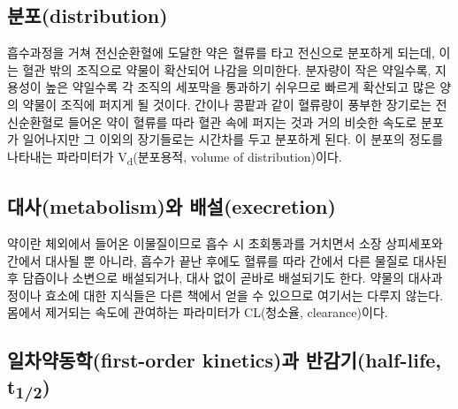 \documentclass[
  11pt,
  krantz2, a4paper, twoside]{krantz}
\theoremstyle{definition}
\theoremstyle{definition}
\theoremstyle{definition}
\theoremstyle{definition}
\theoremstyle{remark}
\begin{document}
\subsection{분포(distribution)}\label{uxbd84uxd3ecdistribution}

흡수과정을 거쳐 전신순환혈에 도달한 약은 혈류를 타고 전신으로 분포하게
되는데, 이는 혈관 밖의 조직으로 약물이 확산되어 나감을 의미한다.
분자량이 작은 약일수록, 지용성이 높은 약일수록 각 조직의 세포막을
통과하기 쉬우므로 빠르게 확산되고 많은 양의 약물이 조직에 퍼지게 될
것이다. 간이나 콩팥과 같이 혈류량이 풍부한 장기로는 전신순환혈로 들어온
약이 혈류를 따라 혈관 속에 퍼지는 것과 거의 비슷한 속도로 분포가
일어나지만 그 이외의 장기들로는 시간차를 두고 분포하게 된다. 이 분포의
정도를 나타내는 파라미터가 V\textsubscript{d}(분포용적, volume of distribution)이다.

\subsection{대사(metabolism)와 배설(execretion)}\label{uxb300uxc0acmetabolismuxc640-uxbc30uxc124execretion}

약이란 체외에서 들어온 이물질이므로 흡수 시 초회통과를 거치면서
소장 상피세포와 간에서 대사될 뿐 아니라, 흡수가 끝난 후에도 혈류를 따라
간에서 다른 물질로 대사된 후 담즙이나 소변으로 배설되거나, 대사 없이
곧바로 배설되기도 한다. 약물의 대사과정이나 효소에 대한 지식들은 다른
책에서 얻을 수 있으므로 여기서는 다루지 않는다. 몸에서 제거되는 속도에
관여하는 파라미터가 CL(청소율, clearance)이다.

\subsection{\texorpdfstring{일차약동학(first-order kinetics)과 반감기(half-life, t\textsubscript{1/2})}{일차약동학(first-order kinetics)과 반감기(half-life, t1/2)}}\label{uxc77cuxcc28uxc57duxb3d9uxd559first-order-kineticsuxacfc-uxbc18uxac10uxae30half-life-t12}

\end{document}

